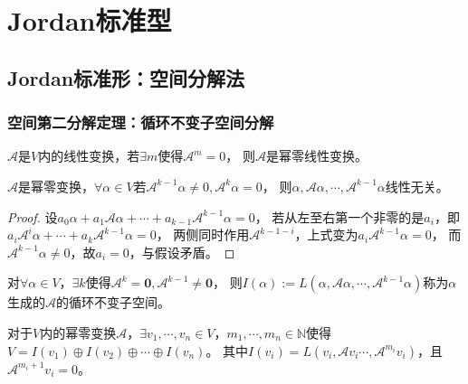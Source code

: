 


\chapter{Jordan标准型}


\section{Jordan标准形：空间分解法}

\subsection{空间第二分解定理：循环不变子空间分解}

\begin{definition}[幂零线性变换]
  $\mathcal{A}$是$V$内的线性变换，若$\exists m$使得$\mathcal{A}^m = 0$，
  则$\mathcal{A}$是幂零线性变换。
\end{definition}

\begin{lemma}[幂零基]
  $\mathcal{A}$是幂零变换，$\forall \alpha \in V$若$\mathcal{A}^{k-1}\alpha \neq 0, \mathcal{A}^k \alpha = 0$，
  则$\alpha, \mathcal{A}\alpha , \cdots, \mathcal{A}^{k-1}\alpha$线性无关。
\end{lemma}

\begin{proof}
  设$a_0 \alpha + a_1 \mathcal{A}\alpha + \cdots + a_{k-1} \mathcal{A}^{k-1}\alpha = 0$，
  若从左至右第一个非零的是$a_i$，即$a_i \mathcal{A}^i \alpha + \cdots + a_k \mathcal{A}^{k-1} \alpha = 0$，
  两侧同时作用$\mathcal{A}^{k-1-i}$，上式变为$a_i \mathcal{A}^{k-1}\alpha = 0$，
  而$\mathcal{A}^{k-1}\alpha \neq 0$，故$a_i = 0$，与假设矛盾。
\end{proof}

\begin{definition}[循环不变子空间]
  对$\forall \alpha \in V$，$\exists k$使得$\mathcal{A}^k = \mathbf{0}, \mathcal{A}^{k-1} \neq \mathbf{0}$，
  则$I(\alpha) := L(\alpha, \mathcal{A}\alpha,\cdots, \mathcal{A}^{k-1}\alpha)$称为$\alpha$生成的$\mathcal{A}$的循环不变子空间。
\end{definition}

\begin{theorem}[循环不变子空间分解]
  对于$V$内的幂零变换$\mathcal{A}$，$\exists v_1,\cdots,v_n \in V$，$m_1,\cdots,m_n \in \mathbb{N}$使得$V = I(v_1) \oplus I(v_2) \oplus \cdots \oplus I(v_n)$。
  其中$I(v_i) = L( v_i, \mathcal{A}v_i \cdots, \mathcal{A}^{m_i} v_i)$，且$\mathcal{A}^{m_i + 1} v_i = 0$。
\end{theorem}

